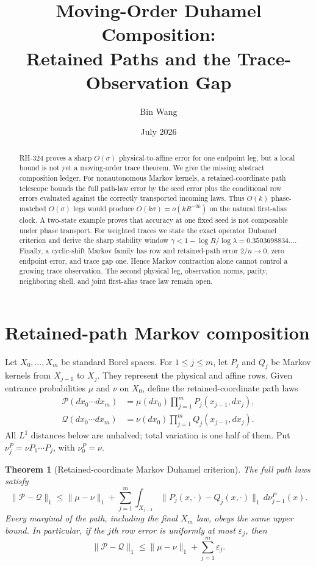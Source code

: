 \documentclass[11pt]{article}
\title{Moving-Order Duhamel Composition:\\Retained Paths and the Trace-Observation Gap}
\author{Bin Wang}
\date{July 2026}
\newtheorem{theorem}{Theorem}[section]
\theoremstyle{remark}
\newcommand{\cP}{\mathcal P}
\newcommand{\cQ}{\mathcal Q}
\begin{document}
\maketitle

\begin{abstract}
RH-324 proves a sharp $O(\sigma)$ physical-to-affine error for one endpoint
leg, but a local bound is not yet a moving-order trace theorem.  We give the
missing abstract composition ledger.  For nonautonomous Markov kernels, a
retained-coordinate path telescope bounds the full path-law error by the seed
error plus the conditional row errors evaluated against the correctly
transported incoming laws.  Thus $O(k)$ phase-matched $O(\sigma)$ legs would
produce $O(k\sigma)=o(kR^{-2k})$ on the natural first-alias clock.  A
two-state example proves that accuracy at one fixed seed is not composable
under phase transport.  For weighted traces we state the exact operator
Duhamel criterion and derive the sharp stability window
$\gamma<1-\log R/\log\lambda=0.3503698834\ldots$.  Finally, a cyclic-shift
Markov family has row and retained-path error $2/n\to0$, zero endpoint error,
and trace gap one.  Hence Markov contraction alone cannot control a growing
trace observation.  The second physical leg, observation norms, parity,
neighboring shell, and joint first-alias trace law remain open.
\end{abstract}

\section{Retained-path Markov composition}

Let $X_0,\ldots,X_m$ be standard Borel spaces.  For $1\le j\le m$, let
$P_j$ and $Q_j$ be Markov kernels from $X_{j-1}$ to $X_j$.  They represent
the physical and affine rows.  Given entrance probabilities $\mu$ and $\nu$
on $X_0$, define the retained-coordinate path laws
\begin{align}
 \cP(dx_0\cdots dx_m)
 &=\mu(dx_0)\prod_{j=1}^mP_j(x_{j-1},dx_j),\label{eq:path-P}\\
 \cQ(dx_0\cdots dx_m)
 &=\nu(dx_0)\prod_{j=1}^mQ_j(x_{j-1},dx_j).\label{eq:path-Q}
\end{align}
All $L^1$ distances below are unhalved; total variation is one half of them.
Put $\nu^P_{j}=\nu P_1\cdots P_j$, with $\nu^P_0=\nu$.

\begin{theorem}[Retained-coordinate Markov Duhamel criterion]
\label{thm:path-duhamel}
The full path laws satisfy
\begin{equation}
 \boxed{
 \|\cP-\cQ\|_1
 \le \|\mu-\nu\|_1
 +\sum_{j=1}^m
 \int_{X_{j-1}}
 \|P_j(x,\cdot)-Q_j(x,\cdot)\|_1\,d\nu^P_{j-1}(x).}
 \label{eq:path-bound}
\end{equation}
Every marginal of the path, including the final $X_m$ law, obeys the same
upper bound.  In particular, if the $j$th row error is uniformly at most
$\varepsilon_j$, then
\begin{equation}
 \|\cP-\cQ\|_1\le\|\mu-\nu\|_1+\sum_{j=1}^m\varepsilon_j.
 \label{eq:sup-bound}
\end{equation}
\end{theorem}
\end{document}
